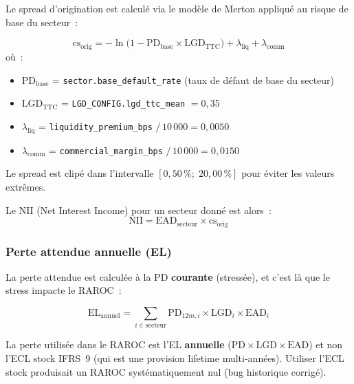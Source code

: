\documentclass[12pt,a4paper]{article}
\begin{document}
Le spread d'origination est calcul\'e via le mod\`ele de Merton appliqu\'e au risque de base du secteur~:

\begin{formulebox}
\begin{equation}
    \text{cs}_{\text{orig}} = -\ln\!\bigl(1 - \text{PD}_{\text{base}} \times \text{LGD}_{\text{TTC}}\bigr) + \lambda_{\text{liq}} + \lambda_{\text{comm}}
    \label{eq:cs_origination}
\end{equation}
o\`u~:
\begin{itemize}[nosep]
    \item $\text{PD}_{\text{base}}$ = \texttt{sector.base\_default\_rate} (taux de d\'efaut de base du secteur)
    \item $\text{LGD}_{\text{TTC}}$ = \texttt{LGD\_CONFIG.lgd\_ttc\_mean} $= 0{,}35$
    \item $\lambda_{\text{liq}}$ = \texttt{liquidity\_premium\_bps} $/\, 10\,000 = 0{,}0050$
    \item $\lambda_{\text{comm}}$ = \texttt{commercial\_margin\_bps} $/\, 10\,000 = 0{,}0150$
\end{itemize}
Le spread est clip\'e dans l'intervalle $[0{,}50\,\% ;\; 20{,}00\,\%]$ pour \'eviter les valeurs extr\^emes.
\end{formulebox}

Le NII (Net Interest Income) pour un secteur donn\'e est alors~:
\begin{equation}
    \text{NII} = \text{EAD}_{\text{secteur}} \times \text{cs}_{\text{orig}}
    \label{eq:nii}
\end{equation}

\subsubsection{Perte attendue annuelle (EL)}

La perte attendue est calcul\'ee \`a la PD \textbf{courante} (stress\'ee), et c'est l\`a que le stress impacte le RAROC~:

\begin{equation}
    \text{EL}_{\text{annuel}} = \sum_{i \in \text{secteur}} \text{PD}_{12m,i} \times \text{LGD}_i \times \text{EAD}_i
    \label{eq:annual_el}
\end{equation}

\begin{warningbox}
La perte utilis\'ee dans le RAROC est l'EL \textbf{annuelle} ($\text{PD} \times \text{LGD} \times \text{EAD}$) et non l'ECL stock IFRS~9 (qui est une provision lifetime multi-ann\'ees). Utiliser l'ECL stock produisait un RAROC syst\'ematiquement nul (bug historique corrig\'e).
\end{warningbox}
\end{document}
